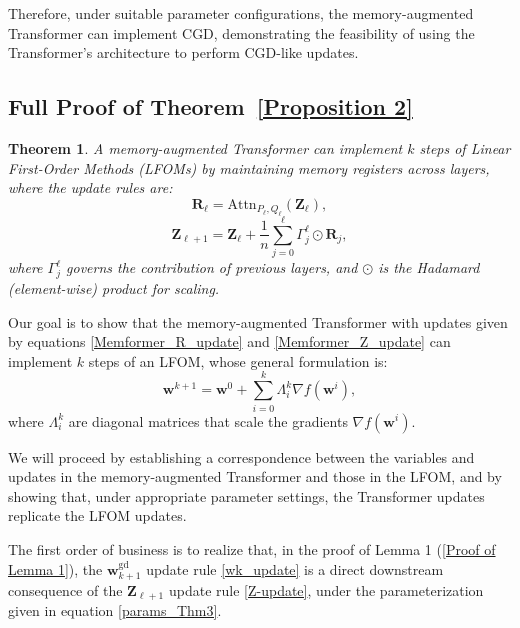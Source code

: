 \documentclass[11pt]{article}
\newtheorem*{theorem*}{Theorem}
\theoremstyle{plain}
\theoremstyle{definition}
\theoremstyle{remark}
\numberwithin{equation}{section}
\begin{document}
Therefore, under suitable parameter configurations, the memory-augmented Transformer can implement CGD, demonstrating the feasibility of using the Transformer's architecture to perform CGD-like updates.

\subsection{Full Proof of Theorem~\ref{Proposition 2}}

\begin{theorem*}
A memory-augmented Transformer can implement \( k \) steps of Linear First-Order Methods (LFOMs) by maintaining memory registers across layers, where the update rules are:
    \begin{equation}
        \mathbf{R}_\ell = \mathrm{Attn}_{P_\ell, Q_\ell}(\mathbf{Z}_\ell), \label{Memformer_R_update}
    \end{equation}
    \begin{equation}
        \mathbf{Z}_{\ell+1} = \mathbf{Z}_\ell + \frac{1}{n} \sum_{j=0}^{\ell} \Gamma_j^\ell \odot \mathbf{R}_j, \label{Memformer_Z_update}
    \end{equation}
    where \( \Gamma_j^\ell \) governs the contribution of previous layers, and \( \odot \) is the Hadamard (element-wise) product for scaling.
\end{theorem*}

Our goal is to show that the memory-augmented Transformer with updates given by equations \eqref{Memformer_R_update} and \eqref{Memformer_Z_update} can implement \( k \) steps of an LFOM, whose general formulation is:
\[
    \mathbf{w}^{k+1} = \mathbf{w}^0 + \sum_{i=0}^k \Lambda_i^k \nabla f(\mathbf{w}^i), \label{eq:LFOM_update}
\]
where \(\Lambda_i^k\) are diagonal matrices that scale the gradients \(\nabla f(\mathbf{w}^i)\).

We will proceed by establishing a correspondence between the variables and updates in the memory-augmented Transformer and those in the LFOM, and by showing that, under appropriate parameter settings, the Transformer updates replicate the LFOM updates.

The first order of business is to realize that, in the proof of Lemma 1 (\ref{Proof of Lemma 1}), the \(\mathbf{w}_{k+1}^{\text{gd}}\) update rule \eqref{wk_update} is a direct downstream consequence of the \(\mathbf{Z}_{\ell+1}\) update rule \eqref{Z-update}, under the parameterization given in equation \eqref{params_Thm3}.
\end{document}
